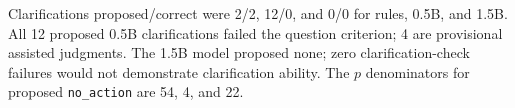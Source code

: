 Clarifications proposed/correct were 2/2, 12/0, and 0/0 for rules, 0.5B, and 1.5B. All 12 proposed 0.5B clarifications failed the question criterion; 4 are provisional assisted judgments. The 1.5B model proposed none; zero clarification-check failures would not demonstrate clarification ability. The $p$ denominators for proposed \texttt{no\_action} are 54, 4, and 22.
